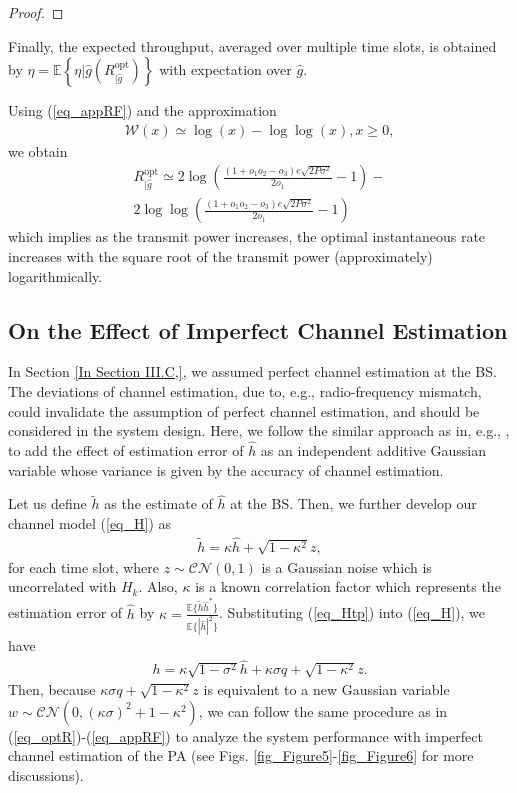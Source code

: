 \begin{proof}
\end{proof}

Finally, the expected throughput, averaged over multiple time slots, is obtained by $\eta = \mathbb{E}\left\{\eta|{\hat {g}}(R_{|\hat{g}}^{\text{opt}})\right\}$ with expectation over $\hat g$.  

Using (\ref{eq_appRF}) and the approximation \cite[Them. 2.1]{hoorfar2007approximation}
\begin{align}
    \mathcal{W}(x) \simeq \log(x)-\log\log(x), x\geq0,
\end{align}
we obtain
\begin{align}
    R_{|\hat{g}}^{\text{opt}}\simeq 2\log\left(\frac{(1+o_1o_2-o_3)e\sqrt{2P\sigma^2}}{2o_1}-1\right)-\nonumber\\
    2\log\log\left(\frac{(1+o_1o_2-o_3)e\sqrt{2P\sigma^2}}{2o_1}-1\right)
\end{align}
which implies as the transmit power increases, the optimal instantaneous rate increases with the square root of the transmit power (approximately) logarithmically.

\subsection{On the Effect of Imperfect Channel Estimation}
In Section \ref{In Section III.C,}, we assumed perfect channel estimation at the BS. The deviations of channel estimation, due to, e.g., radio-frequency mismatch, could invalidate the assumption of perfect channel estimation, and should be considered in the system design. Here, we follow the similar approach as in, e.g., \cite{Wang2007TWCperformance}, to add the effect of estimation error of $\hat{h}$ as an independent additive Gaussian variable whose variance is given by the accuracy of channel estimation. 

Let us define $\tilde h$ as the estimate of $\hat h$ at the BS. Then,  we further develop our channel model  (\ref{eq_H}) as
\begin{align}\label{eq_Htp}
    \tilde{h} = \kappa \hat{h} + \sqrt{1-\kappa^2} z, 
\end{align}
for each time slot, where $z \sim \mathcal{CN}(0,1)$ is a Gaussian noise which is uncorrelated with $H_{k}$. Also, $\kappa$ is a known correlation factor which represents the estimation error of $\hat{h}$ by $\kappa = \frac{\mathbb{E}\{\tilde{h}\hat{h}^*\}}{\mathbb{E}\{|\hat{h}|^2\}}$. Substituting (\ref{eq_Htp}) into (\ref{eq_H}), we have
\begin{align}\label{eq_Ht}
    h = \kappa\sqrt{1-\sigma^2}\hat{h}+\kappa\sigma q+\sqrt{1-\kappa^2}z.
\end{align}
Then, because  $\kappa\sigma q + \sqrt{1-\kappa^2}z$ is equivalent to a new Gaussian variable $w \sim\mathcal{CN}\left(0,(\kappa\sigma)^2+1-\kappa^2\right)$, we can follow the same procedure as in (\ref{eq_optR})-(\ref{eq_appRF}) to analyze the system performance with imperfect channel estimation of the PA (see Figs. \ref{fig_Figure5}-\ref{fig_Figure6} for more discussions).

